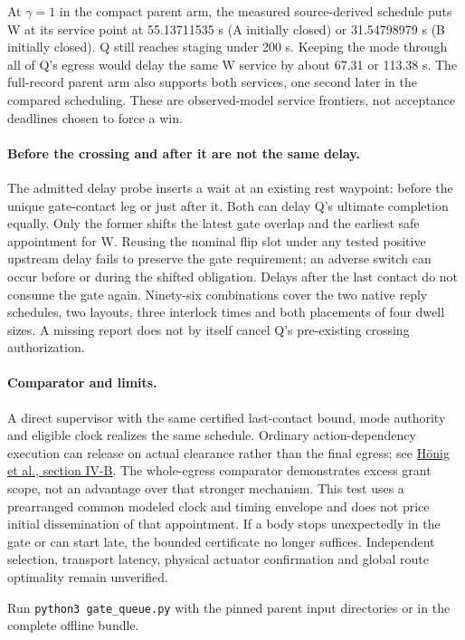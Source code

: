 \documentclass{article}
\begin{document}
At \(\gamma=1\) in the compact parent arm, the measured
source-derived schedule puts W at its service point at
55.13711535 s (A initially closed) or 31.54798979 s (B
initially closed). Q still reaches staging under 200 s.
Keeping the mode through all of Q's egress would delay the
same W service by about 67.31 or 113.38 s. The full-record
parent arm also supports both services, one second later in
the compared scheduling. These are observed-model service
frontiers, not acceptance deadlines chosen to force a win.

\paragraph{Before the crossing and after it are not the same delay.}
The admitted delay probe inserts a wait at an existing
rest waypoint: before the unique gate-contact leg or just
after it. Both can delay Q's ultimate completion equally.
Only the former shifts the latest gate overlap and the earliest
safe appointment for W. Reusing the nominal flip slot under
any tested positive upstream delay fails to preserve the gate
requirement; an adverse switch can occur before or during the
shifted obligation. Delays after the last contact do not consume
the gate again. Ninety-six combinations cover the two native
reply schedules, two layouts, three interlock times and
both placements of four dwell sizes. A missing report does
not by itself cancel Q's pre-existing crossing authorization.

\paragraph{Comparator and limits.}
A direct supervisor with the same certified last-contact bound,
mode authority and eligible clock realizes the same schedule.
Ordinary action-dependency execution can release on actual
clearance rather than the final egress; see
\href{https://whoenig.github.io/publications/2019_RA-L_Hoenig.pdf}{H\"onig et al., section IV-B}.
The whole-egress comparator demonstrates excess grant scope,
not an advantage over that stronger mechanism. This test uses
a prearranged common modeled clock and timing envelope and
does not price initial dissemination of that appointment.
If a body stops unexpectedly in the gate or can start late,
the bounded certificate no longer suffices. Independent
selection, transport latency, physical actuator confirmation
and global route optimality remain unverified.

Run \texttt{python3 gate\_queue.py} with the pinned parent input
directories or in the complete offline bundle.
\end{document}
